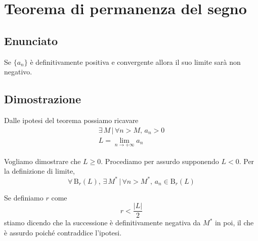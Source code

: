 \documentclass[../../dimostrazioni]{subfiles}
\begin{document}
    \chapter{Teorema di permanenza del segno}
    \label{teoPermSegno}

        \section*{Enunciato}

            Se \(\{a_n\}\) è definitivamente positiva e convergente allora il suo limite sarà non negativo.

        \section*{Dimostrazione}

            Dalle ipotesi del teorema possiamo ricavare
            \begin{gather*}
                \exists \, M \, | \, \forall n > M, \, a_n > 0\\
                L = \lim_{n \to +\infty} a_n
            \end{gather*}

            Vogliamo dimostrare che \(L \geqslant 0\). Procediamo per assurdo supponendo \(L < 0\). Per la definizione
            di limite,
            \[
                \forall \, \mathrm{B}_r (L), \, \exists \, M^* \, | \, \forall n > M^*, \, a_n \in \mathrm{B}_r (L)
            \]

            Se definiamo \(r\) come
            \[
                r < \frac{|L|}{2}
            \]
            stiamo dicendo che la successione è definitivamente negativa da \(M^*\) in poi, il che è assurdo poiché
            contraddice l'ipotesi.
    
\end{document}
